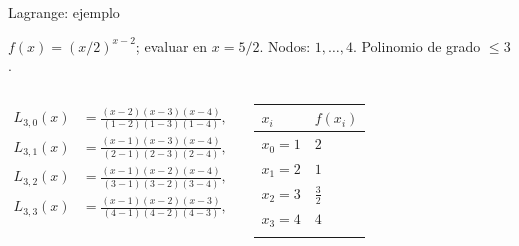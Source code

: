 \documentclass[original_version/main.tex]{subfiles}
\begin{document}
\begin{frame}[t]{Lagrange: ejemplo}
\par\noindent\begin{minipage}[t][7.5mm][t]{\textwidth}\small\strut $f(x)=(x/2)^{x-2}$; evaluar en $x=5/2$. Nodos: $1,\ldots,4$. Polinomio de grado $\le 3$.\end{minipage}\par\nointerlineskip
\begin{columns}[T]\small\setlength{\abovedisplayskip}{4pt}\setlength{\belowdisplayskip}{4pt}\scriptsize\begin{align*}L_{3,0}(x)&=\frac{(x-2)(x-3)(x-4)}{(1-2)(1-3)(1-4)},\\L_{3,1}(x)&=\frac{(x-1)(x-3)(x-4)}{(2-1)(2-3)(2-4)},\\L_{3,2}(x)&=\frac{(x-1)(x-2)(x-4)}{(3-1)(3-2)(3-4)},\\L_{3,3}(x)&=\frac{(x-1)(x-2)(x-3)}{(4-1)(4-2)(4-3)},\\\end{align*}\begingroup\small\setlength{\tabcolsep}{3pt}\begin{center}\begin{tabular}{|C{.42\textwidth}|C{.42\textwidth}|}\hline
\rule[-2mm]{0pt}{6mm}$x_i$&$f(x_i)$\\\hline
\rule[-2.5mm]{0pt}{6mm}$x_0=1$&$2$\\\hline
\rule[-2.5mm]{0pt}{6mm}$x_1=2$&$1$\\\hline
\rule[-2.5mm]{0pt}{6mm}$x_2=3$&$\frac{3}{2}$\\\hline
\rule[-2.5mm]{0pt}{6mm}$x_3=4$&$4$\\\hline
\rule[-2.5mm]{0pt}{6mm}&\\\hline
\end{tabular}\end{center}\endgroup\par
\end{columns}
\end{frame}
\end{document}
